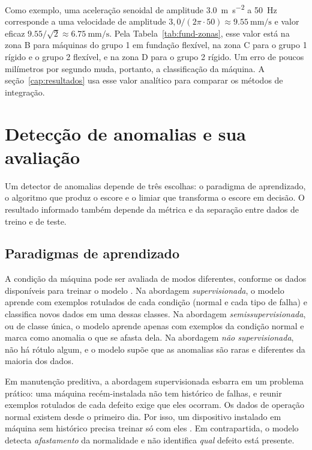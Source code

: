 Como exemplo, uma aceleração senoidal de amplitude \SI{3,0}{\meter\per\second\squared} a \SI{50}{\hertz} corresponde a uma velocidade de amplitude
$3{,}0/(2\pi \cdot 50) \approx \SI{9,55}{\milli\meter\per\second}$ e valor eficaz $\num{9,55}/\sqrt{2} \approx \SI{6,75}{\milli\meter\per\second}$. Pela
Tabela~\ref{tab:fund-zonas}, esse valor está na zona B para máquinas do grupo 1 em fundação flexível, na zona C para o grupo 1 rígido e o grupo 2
flexível, e na zona D para o grupo 2 rígido. Um erro de poucos milímetros por segundo muda, portanto, a classificação da máquina. A
seção~\ref{cap:resultados} usa esse valor analítico para comparar os métodos de integração.

\section{Detecção de anomalias e sua avaliação}
\label{sec:fund-anomalias}

Um detector de anomalias depende de três escolhas: o paradigma de aprendizado, o algoritmo que produz o escore e o limiar que transforma o escore em
decisão. O resultado informado também depende da métrica e da separação entre dados de treino e de teste.

\subsection{Paradigmas de aprendizado}

A condição da máquina pode ser avaliada de modos diferentes, conforme os dados disponíveis para treinar o modelo \cite{chandola2009}. Na abordagem
\emph{supervisionada}, o modelo aprende com exemplos rotulados de cada condição (normal e cada tipo de falha) e classifica novos dados em uma dessas
classes. Na abordagem \emph{semissupervisionada}, ou de classe única, o modelo aprende apenas com exemplos da condição normal e marca como anomalia o que
se afasta dela. Na abordagem \emph{não supervisionada}, não há rótulo algum, e o modelo supõe que as anomalias são raras e diferentes da maioria dos dados.

Em manutenção preditiva, a abordagem supervisionada esbarra em um problema prático: uma máquina recém-instalada não tem histórico de falhas, e reunir
exemplos rotulados de cada defeito exige que eles ocorram. Os dados de operação normal existem desde o primeiro dia. Por isso, um dispositivo instalado em
máquina sem histórico precisa treinar só com eles \cite{chandola2009}. Em contrapartida, o modelo detecta
\emph{afastamento} da normalidade e não identifica \emph{qual} defeito está presente.

